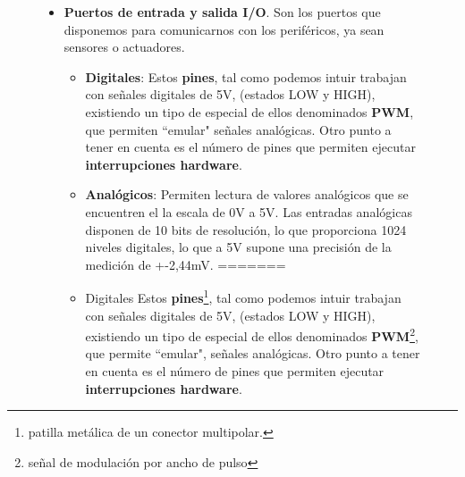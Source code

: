 \begin{figure}[h]
\begin{itemize}
\begin{itemize}
		\item{Flash} (espacio del programa) es donde Arduino almacena el \textbf{sketch}\footnote{Un sketch es el nombre que usa Arduino para un programa.}. Esta memoria es no volátil y su tamaño oscila entre los 16 kilobytes.
		
		\item{SRAM} Static Random Access Memory ó memoria estática de acceso aleatorio,  es de tipo volátil, es el espacio donde los sketches (programas) almacenan y manipulan variables al ejecutarse. La información guardada en esta memoria será eliminada cuando Arduino pierda la alimentación. Esta memoria es de uso exclusivo para el programa en ejecución. Su tamaño oscila entre los 1024 bytes.
		
		\item{EEPROM} es un espacio de memoria que puede ser utilizado por los programadores para almacenar información a largo plazo. Este tipo de memoria es no volátil, por lo que los datos guardados en ella permanecerán aunque Arduino pierda la alimentación. Permite almacenar configuraciones de la sesión, he de decir que tiene un número de escrituras muy limitado por lo cual no se puede usar de forma extensiva. Su tamaño oscila entre los 512 bytes.
>>>>>>> c9f08dfe66521d4f0dba18e652f93a6a37a333aa
		
	\end{itemize}
	\item \textbf {Puertos de entrada y salida I/O}. Son los puertos que disponemos para comunicarnos con los periféricos, ya sean sensores o actuadores. 
	\begin{itemize}
<<<<<<< HEAD
		\item \textbf{Digitales}: Estos \textbf{pines}, tal como podemos intuir trabajan con señales digitales de 5V, (estados LOW y HIGH), existiendo un tipo de especial de ellos denominados \textbf{PWM}, que permiten ``emular" señales analógicas. Otro punto a tener en cuenta es el número de pines que permiten ejecutar \textbf{interrupciones hardware}. 
		
		\item \textbf{Analógicos}: Permiten lectura de valores analógicos que se encuentren el la escala de 0V a 5V. Las entradas analógicas disponen de 10 bits de resolución, lo que proporciona 1024 niveles digitales, lo que a 5V supone una precisión de la medición de +-2,44mV. 
=======
		\item{Digitales} Estos \textbf{pines}\footnote{patilla metálica de un conector multipolar.}, tal como podemos intuir trabajan con señales digitales de 5V, (estados LOW y HIGH), existiendo un tipo de especial de ellos denominados \textbf{PWM}\footnote{señal de modulación por ancho de pulso}, que permite ``emular", señales analógicas. \newline
		Otro punto a tener en cuenta es el número de pines que permiten ejecutar  \textbf{interrupciones hardware}. 
		

\end{itemize}
\end{itemize}
\end{figure}
